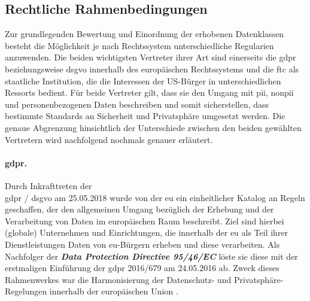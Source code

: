\subsection{Rechtliche Rahmenbedingungen}
\label{sec:Grundlagen:ssec:Rechtliche Rahmenbedingungen}

Zur grundlegenden Bewertung und Einordnung der erhobenen Datenklassen besteht die Möglichkeit je nach Rechtssystem unterschiedliche Regularien anzuwenden. Die beiden wichtigsten Vertreter ihrer Art sind einerseits die \acl{gdpr} beziehungsweise \acl{dsgvo} innerhalb des europäischen Rechtssystems und die \acl{ftc} als staatliche Institution, die die Interessen der US-Bürger in unterschiedlichen Ressorts bedient. Für beide Vertreter gilt, dass sie den Umgang mit \ac{pii}, \ac{nonpii} und personenbezogenen Daten beschreiben und somit sicherstellen, dass bestimmte Standards an Sicherheit und Privatsphäre umgesetzt werden. Die genaue Abgrenzung hinsichtlich der Unterschiede zwischen den beiden gewählten Vertretern wird nachfolgend nochmals genauer erläutert.


\paragraph{\acl{gdpr}.}
\label{sec:Grundlagen:para:GDPR}
Durch Inkrafttreten der \\ \ac{gdpr} / \ac{dsgvo} am 25.05.2018 wurde von der \acl{eu} ein einheitlicher Katalog an Regeln geschaffen, der den allgemeinen Umgang bezüglich der Erhebung und der Verarbeitung von Daten im europäischen Raum beschreibt. Ziel sind hierbei (globale) Unternehmen und Einrichtungen, die innerhalb der \acl{eu} als Teil ihrer Dienstleistungen Daten von \ac{eu}-Bürgern erheben und diese verarbeiten. Als Nachfolger der \textbf{\textit{Data Protection Directive 95/46/EC}} löste sie diese mit der erstmaligen Einführung der \ac{gdpr} 2016/679 am 24.05.2016 ab. Zweck dieses Rahmenwerkes war die Harmonisierung der Datenschutz- und Privatsphäre-Regelungen innerhalb der europäischen Union \cite{Bastos2019}.

